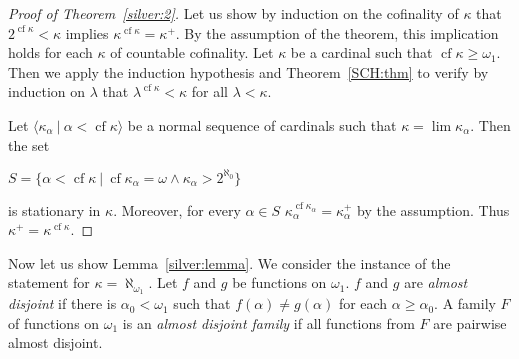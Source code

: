 \documentclass[8pt]{article}
\theoremstyle{definition}
\theoremstyle{definition}
\theoremstyle{definition}
\theoremstyle{definition}
\theoremstyle{definition}
\theoremstyle{definition}
\theoremstyle{definition}
\theoremstyle{definition}
\theoremstyle{definition}
\theoremstyle{definition}
\theoremstyle{definition}
\theoremstyle{definition}
\theoremstyle{definition}
\theoremstyle{definition}
\theoremstyle{question}
\begin{document}
\begin{proof}[Proof of Theorem~\ref{silver:2}]
  Let us show by induction on the cofinality of $\kappa$ that $2^{\operatorname{cf} \kappa} < \kappa$ implies
  $\kappa^{\operatorname{cf} \kappa} = \kappa^+$. By the assumption of the theorem, this implication holds
  for each $\kappa$ of countable cofinality.
  Let $\kappa$ be a cardinal such that $\operatorname{cf} \kappa \geq \omega_1$. Then we apply
  the induction hypothesis and Theorem~\ref{SCH:thm} to verify by induction on $\lambda$
  that $\lambda^{\operatorname{cf} \kappa} < \kappa$ for all $\lambda < \kappa$.

  Let $\langle \kappa_{\alpha} \: | \: \alpha < \operatorname{cf} \kappa \rangle$ be a normal sequence of cardinals
  such that $\kappa = \lim \kappa_{\alpha}$. Then the set
  \begin{center}
    $S = \{ \alpha < \operatorname{cf} \kappa \: | \: \operatorname{cf} \kappa_{\alpha} = \omega \land \kappa_{\alpha} > 2^{\aleph_0}\}$
  \end{center}
  is stationary in $\kappa$. Moreover, for every $\alpha \in S$ 
  $\kappa^{\operatorname{cf} \kappa_{\alpha}}_{\alpha} = \kappa^+_{\alpha}$ by the assumption.
  Thus $\kappa^+ = \kappa^{\operatorname{cf} \kappa}$.
\end{proof}

Now let us show Lemma~\ref{silver:lemma}. We consider the instance of the statement for $\kappa = \aleph_{\omega_1}$.
Let $f$ and $g$ be functions on $\omega_1$. $f$ and $g$ are \emph{almost disjoint} if there is
$\alpha_0 < \omega_1$ such that $f(\alpha) \neq g(\alpha)$ for each $\alpha \geq \alpha_0$.
A family $F$ of functions on $\omega_1$ is an \emph{almost disjoint family} if all functions from $F$ are pairwise
almost disjoint.
\end{document}
